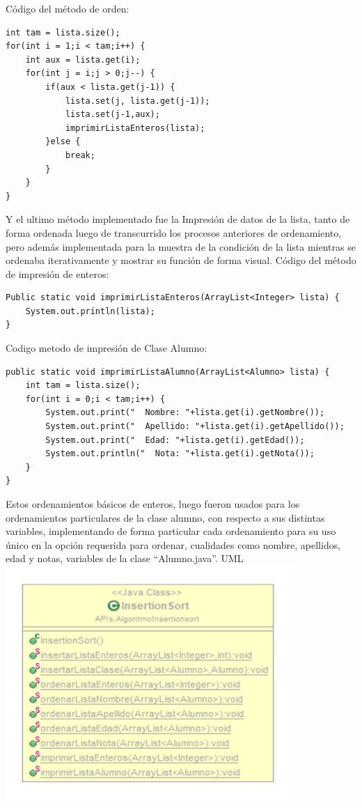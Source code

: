 \documentclass[12pt,letterpaper]{article}
\begin{document}
\vskip 0.4cm
Código del método de orden:
\vskip 0.4cm
\begin{lstlisting}
int tam = lista.size();
for(int i = 1;i < tam;i++) {
	int aux = lista.get(i);
	for(int j = i;j > 0;j--) {
		if(aux < lista.get(j-1)) {
			lista.set(j, lista.get(j-1));
			lista.set(j-1,aux);
			imprimirListaEnteros(lista);
		}else {
			break;
		}
	}
}
\end{lstlisting}
\vskip 0.4cm
Y el ultimo método implementado fue la Impresión de datos de la lista, tanto de forma ordenada luego de transcurrido los procesos anteriores de ordenamiento, pero además implementada para la muestra de la condición de la lista mientras se ordenaba iterativamente y mostrar su función de forma visual.
\vskip 0.4cm
Código del método de impresión de enteros:
\vskip 0.4cm
\begin{lstlisting}
Public static void imprimirListaEnteros(ArrayList<Integer> lista) {
	System.out.println(lista);
}
\end{lstlisting}
\vskip 0.4cm
Codigo metodo de impresión de Clase Alumno:
\vskip 0.4cm
\begin{lstlisting}
public static void imprimirListaAlumno(ArrayList<Alumno> lista) {
	int tam = lista.size();
	for(int i = 0;i < tam;i++) {
		System.out.print("  Nombre: "+lista.get(i).getNombre());
		System.out.print("  Apellido: "+lista.get(i).getApellido());
		System.out.print("  Edad: "+lista.get(i).getEdad());
		System.out.println("  Nota: "+lista.get(i).getNota());
	}
}
\end{lstlisting}
\vskip 0.4cm
Estos ordenamientos básicos de enteros, luego fueron usados para los ordenamientos particulares de la clase alumno, con respecto a sus distintas variables, implementando de forma particular cada ordenamiento para su uso único en la opción requerida para ordenar, cualidades como nombre, apellidos, edad y notas, variables de la clase “Alumno.java”.
\vskip 0.4cm
UML
\vskip 0.2cm
\includegraphics[width=11cm,height=9cm]{Imagen5} 
\vskip 0.4cm
\newpage
\end{document}
